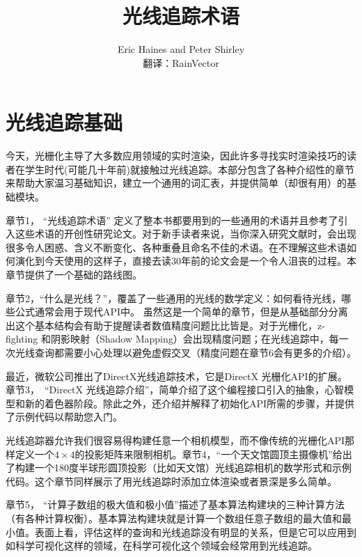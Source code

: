 \documentclass[12pt]{article}
\begin{document}
 
 
 
\title{光线追踪术语}%
\author{Eric Haines and Peter Shirley \\
	翻译：RainVector} 
 
\maketitle
\tableofcontents
 \section{光线追踪基础}
今天，光栅化主导了大多数应用领域的实时渲染，因此许多寻找实时渲染技巧的读者在学生时代(可能几十年前)就接触过光线追踪。本部分包含了各种介绍性的章节来帮助大家温习基础知识，建立一个通用的词汇表，并提供简单（却很有用）的基础模块。

章节\color{blue}1\color{black}， “光线追踪术语” 定义了整本书都要用到的一些通用的术语并且参考了引入这些术语的开创性研究论文。对于新手读者来说，当你深入研究文献时，会出现很多令人困惑、含义不断变化、各种重叠且命名不佳的术语。在不理解这些术语如何演化到今天使用的这样子，直接去读30年前的论文会是一个令人沮丧的过程。本章节提供了一个基础的路线图。

章节\color{blue}2\color{black}，“什么是光线？”，覆盖了一些通用的光线的数学定义：如何看待光线，哪些公式通常会用于现代API中。 虽然这是一个简单的章节，但是从基础部分分离出这个基本结构会有助于提醒读者数值精度问题比比皆是。对于光栅化，z-fighting 和阴影映射（Shadow Mapping）会出现精度问题；在光线追踪中，每一次光线查询都需要小心处理以避免虚假交叉（精度问题在章节6会有更多的介绍）。

最近，微软公司推出了DirectX光线追踪技术，它是DirectX 光栅化API的扩展。章节\color{blue}3\color{black}，\ “DirectX 光线追踪介绍”，简单介绍了这个编程接口引入的抽象，心智模型和新的着色器阶段。除此之外，还介绍并解释了初始化API所需的步骤，并提供了示例代码以帮助您入门。

光线追踪器允许我们很容易得构建任意一个相机模型，而不像传统的光栅化API那样定义一个$4\times 4$的投影矩阵来限制相机。章节\color{blue}4\color{black}，“一个天文馆圆顶主摄像机”给出了构建一个180度半球形圆顶投影（比如天文馆）光线追踪相机的数学形式和示例代码。这个章节同样展示了用光线追踪时添加立体渲染或者景深是多么简单。

章节\color{blue}5\color{black}， “计算子数组的极大值和极小值”描述了基本算法构建块的三种计算方法（有各种计算权衡）。基本算法构建块就是计算一个数组任意子数组的最大值和最小值。表面上看，评估这样的查询和光线追踪没有明显的关系，但是它可以应用到如科学可视化这样的领域，在科学可视化这个领域会经常用到光线追踪。
\end{document}
